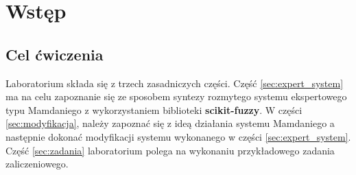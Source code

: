 \section{Wstęp}\label{sec:wstep}
\subsection{Cel ćwiczenia}\label{subsec:cel}

Laboratorium składa się z trzech zasadniczych części. Część \ref{sec:expert_system} ma na celu zapoznanie się ze sposobem syntezy rozmytego systemu ekspertowego typu Mamdaniego z wykorzystaniem biblioteki \textbf{scikit-fuzzy}. W części \ref{sec:modyfikacja}, należy zapoznać się z ideą działania systemu Mamdaniego a następnie dokonać modyfikacji systemu wykonanego w części \ref{sec:expert_system}. Część \ref{sec:zadania} laboratorium polega na wykonaniu przykładowego zadania zaliczeniowego.
